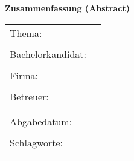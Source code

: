 
\begin{center}
{\Large \textbf{Zusammenfassung (Abstract)}}
\end{center}

\bigskip

\begin{center}
	\begin{tabular}{p{2.8cm}p{10cm}}
		Thema: & \thema \\
		 & \\
		Bachelorkandidat: & \autor \\
		 & \\
		Firma: & \firma \\
		 & \\
		Betreuer: & \prueferA  \\[.5ex]
		 &  \prueferB \\
		 & \\
		Abgabedatum: & \abgabedatum \\
		 & \\
		Schlagworte: & \schlagworte \\
		 & \\
	\end{tabular}
\end{center}

\bigskip

\noindent
\zusammenfassung